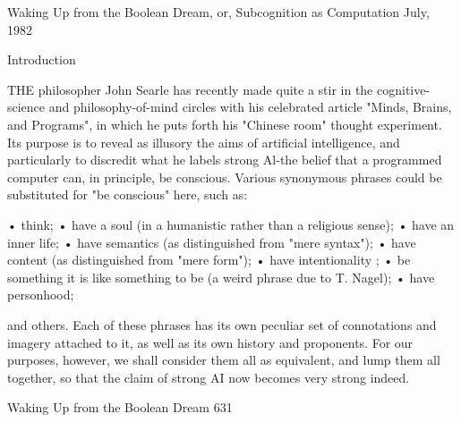 

                           Waking Up
                     from the Boolean Dream,
                 or, Subcognition as Computation
                                        July, 1982

                                     Introduction

THE philosopher John Searle has recently made quite a stir in the cognitive-
science and philosophy-of-mind circles with his celebrated article "Minds, Brains, and
Programs", in which he puts forth his "Chinese room" thought experiment. Its purpose
is to reveal as illusory the aims of artificial intelligence, and particularly to discredit
what he labels strong Al-the belief that a programmed computer can, in principle, be
conscious. Various synonymous phrases could be substituted for "be conscious" here,
such as:

•      think;
•      have a soul (in a humanistic rather than a religious sense);
•      have an inner life;
•      have semantics (as distinguished from "mere syntax");
•      have content (as distinguished from "mere form");
•      have intentionality ;
•      be something it is like something to be (a weird phrase due to T. Nagel);
•      have personhood;

and others. Each of these phrases has its own peculiar set of connotations and imagery
attached to it, as well as its own history and proponents. For our purposes, however,
we shall consider them all as equivalent, and lump them all together, so that the claim
of strong AI now becomes very strong indeed.




Waking Up from the Boolean Dream                                                       631

